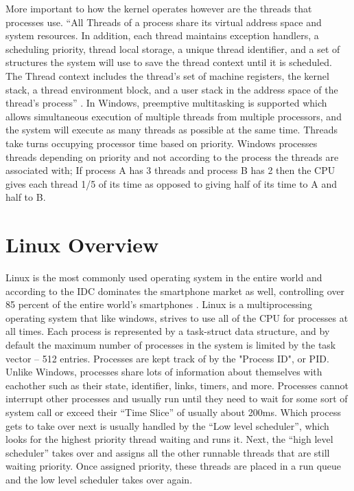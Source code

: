 \documentclass[onecolumn, draftclsnofoot,10pt, compsoc]{IEEEtran}
\begin{document}
More important to how the kernel operates however are the threads that processes use. “All Threads of a process share its virtual address space and system resources. In addition, each thread maintains exception handlers, a scheduling priority, thread local storage, a unique thread identifier, and a set of structures the system will use to save the thread context until it is scheduled. The Thread context includes the thread’s set of machine registers, the kernel stack, a thread environment block, and a user stack in the address space of the thread’s process” \cite{WindowsDev}. In Windows, preemptive multitasking is supported which allows simultaneous execution of multiple threads from multiple processors, and the system will execute as many threads as possible at the same time. Threads take turns occupying processor time based on priority. Windows processes threads depending on priority and not according to the process the threads are associated with; If process A has 3 threads and process B has 2 then the CPU gives each thread 1/5 of its time as opposed to giving half of its time to A and half to B. \\

	
\section{Linux Overview}
	Linux is the most commonly used operating system in the entire world and according to the IDC dominates the smartphone market as well, controlling over 85 percent of the entire world’s smartphones \cite{IDC}. Linux is a multiprocessing operating system that like windows, strives to use all of the CPU for processes at all times. Each process is represented by a task-struct data structure, and by default the maximum number of processes in the system is limited by the task vector – 512 entries. Processes are kept track of by the "Process ID", or PID. Unlike Windows, processes share lots of information about themselves with eachother such as their state, identifier, links, timers, and more. Processes cannot interrupt other processes and usually run until they need to wait for some sort of system call or exceed their “Time Slice” of usually about 200ms. \cite{tldp} Which process gets to take over next is usually handled by the “Low level scheduler”, which looks for the highest priority thread waiting and runs it. Next, the “high level scheduler” takes over and assigns all the other runnable threads that are still waiting priority. Once assigned priority, these threads are placed in a run queue and the low level scheduler takes over again. \\
	   
\end{document}
